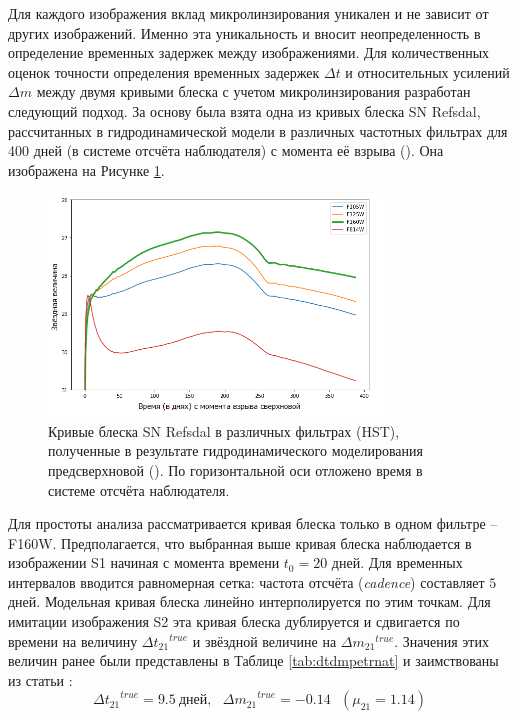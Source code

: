 Для каждого изображения вклад микролинзирования уникален и не зависит от других изображений. Именно эта уникальность и вносит неопределенность в определение временных задержек между изображениями. Для количественных оценок точности определения временных задержек $\Delta t$ и относительных усилений $\Delta m$ между двумя кривыми блеска с учетом микролинзирования разработан следующий подход. За основу была взята одна из кривых блеска SN Refsdal, рассчитанных в гидродинамической модели в различных частотных фильтрах для 400 дней (в системе отсчёта наблюдателя) с момента её взрыва (\cite{petrnat2020}). Она изображена на Рисунке \ref{fig:lightcurves}. 

\begin{figure}[H]
    \centering
	\includegraphics[width=0.79\textwidth]{pics/lightcurves.png}
	\caption{Кривые блеска SN Refsdal в различных фильтрах (HST), полученные в результате гидродинамического моделирования предсверхновой (\cite{petrnat2020}). По горизонтальной оси отложено время в системе отсчёта наблюдателя.} 
	\label{fig:lightcurves}
\end{figure}

Для простоты анализа рассматривается кривая блеска только в одном фильтре -- F160W. Предполагается, что выбранная выше кривая блеска наблюдается в изображении S1 начиная с момента времени $t_0=20$ дней. Для временных интервалов вводится равномерная сетка: частота отсчёта (\textit{cadence}) составляет $5$ дней. Модельная кривая блеска линейно интерполируется по этим точкам. Для имитации изображения S2 эта кривая блеска дублируется и сдвигается по времени на величину $\Delta {t_{21}}^{true}$ и звёздной величине на $\Delta {m_{21}}^{true}$. Значения этих величин ранее были представлены в Таблице \eqref{tab:dtdmpetrnat} и заимствованы из статьи \cite{petrnat2020}:
$${\Delta t_{21}}^{true} = 9.5 \ \textrm{дней}, \ \ \ {\Delta m_{21}}^{true} = -0.14 \ \ \ (\mu_{21} = 1.14)$$

